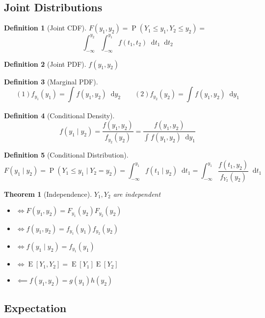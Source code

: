 \documentclass[fontsize=12pt]{article}
\newcommand{\pr}[1]{\operatorname{P}(#1)}
\newcommand{\expt}[1]{\operatorname{E}[#1]}
\newcommand*\diff{\mathop{}\!\mathrm{d}}
\newcommand{\intv}[4]{\int_{#3}^{#4} #1 \diff #2}
\newtheorem*{theorem}{Theorem}
\newtheorem*{definition}{Definition}
\begin{document}
\subsection{Joint Distributions}

\begin{definition}[Joint CDF]
$F(y_1, y_2) = \pr{Y_1 \leq y_1, Y_2 \leq y_2} = $ \[
    \intv{ \intv{ f(t_1, t_2) }{t_1}{-\infty}{y_1} }{t_2}{-\infty}{y_2}
\]
\end{definition}

\begin{definition}[Joint PDF]
    $f(y_1, y_2)$
\end{definition}


\begin{definition}[Marginal PDF]
\[
    (1) f_{y_1}(y_1) = \intv{ f(y_1, y_2) }{y_2}{}{}
    \qquad
    (2) f_{y_2}(y_2) = \intv{ f(y_1, y_2) }{y_1}{}{}
\]
\end{definition}

\begin{definition}[Conditional Density]
\[
    f(y_1 \mid y_2)
    = \frac{f(y_1, y_2)}{f_{y_2}(y_2)} 
    = \frac{f(y_1, y_2)}{\intv{ f(y_1, y_2) }{y_1}{}{}}
\]
\end{definition}

\begin{definition}[Conditional Distribution]
\[
    F(y_1 \mid y_2) = \pr{Y_1 \leq y_1 \mid Y_2 = y_2}
    = \intv{f(t_1 \mid  y_2)}{t_1}{-\infty}{y_1}
    = \intv{\frac{f(t_1, y_2)}{f_{Y_2}(y_2)}}{t_1}{-\infty}{y_1}
\]
\end{definition}

\begin{theorem}[Independence]
$Y_1, Y_2$ are independent
\begin{itemize}
    \item $\iff F(y_1, y_2) = F_{y_1}(y_2)F_{y_2}(y_2)$
    \item $\iff f(y_1, y_2) = f_{y_1}(y_1)f_{y_2}(y_2)$
    \item $\iff f(y_1 \mid y_2) = f_{y_1}(y_1)$
    \item $\iff \expt{Y_1, Y_2} = \expt{Y_1}\expt{Y_2}$
    \item $\impliedby f(y_1, y_2) = g(y_1)h(y_2)$
\end{itemize}
\end{theorem}
\subsection{Expectation}
\end{document}
